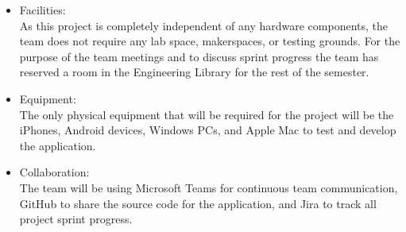 \begin{itemize}
    \item Facilities:
    \\ As this project is completely independent of any hardware components, the team does not require any lab space, makerspaces, or testing grounds. For the purpose of the team meetings and to discuss sprint progress the team has reserved a room in the Engineering Library for the rest of the semester.
    \item Equipment:
    \\ The only physical equipment that will be required for the project will be the iPhones, Android devices, Windows PCs, and Apple Mac to test and develop the application. 
    \item Collaboration:
    \\ The team will be using Microsoft Teams for continuous team communication, GitHub to share the source code for the application, and Jira to track all project sprint progress.
\end{itemize}
 